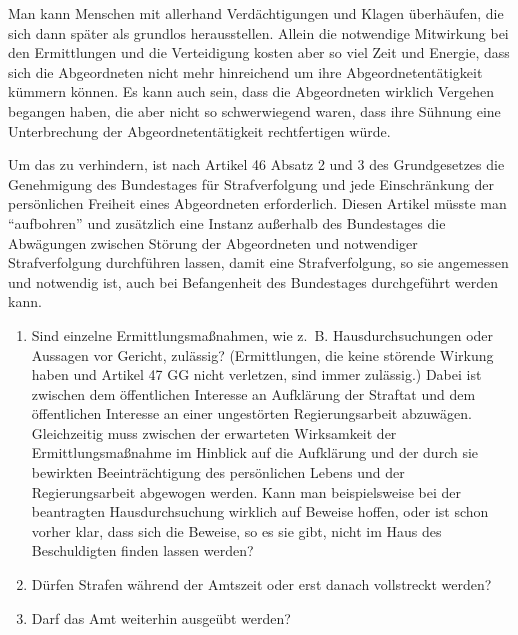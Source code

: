 Man kann Menschen mit allerhand Verdächtigungen und Klagen überhäufen, die sich dann später als grundlos herausstellen.
Allein die notwendige Mitwirkung bei den Ermittlungen und die Verteidigung kosten aber so viel Zeit und Energie, dass sich die Abgeordneten nicht mehr hinreichend um ihre Abgeordnetentätigkeit kümmern können.
Es kann auch sein, dass die Abgeordneten wirklich Vergehen begangen haben, die aber nicht so schwerwiegend waren, dass ihre Sühnung eine Unterbrechung der Abgeordnetentätigkeit rechtfertigen würde.

Um das zu verhindern, ist nach Artikel 46 Absatz 2 und 3 des Grundgesetzes die Genehmigung des Bundestages für Strafverfolgung und jede Einschränkung der persönlichen Freiheit eines Abgeordneten erforderlich.
Diesen Artikel müsste man \enquote{aufbohren} und zusätzlich eine Instanz außerhalb des Bundestages die Abwägungen zwischen Störung der Abgeordneten und notwendiger Strafverfolgung durchführen
lassen, damit eine Strafverfolgung, so sie angemessen und notwendig ist, auch bei Befangenheit des Bundestages durchgeführt werden kann.


 \begin{enumerate}
     \item Sind einzelne Ermittlungsmaßnahmen, wie z.~B. Hausdurchsuchungen oder Aussagen vor Gericht, zulässig?
     (Ermittlungen, die keine störende Wirkung haben und Artikel 47 GG nicht verletzen, sind immer zulässig.)
     Dabei ist zwischen dem öffentlichen Interesse an Aufklärung der Straftat und dem öffentlichen Interesse an einer ungestörten Regierungsarbeit abzuwägen.
     Gleichzeitig muss zwischen der erwarteten Wirksamkeit der Ermittlungsmaßnahme im Hinblick auf die Aufklärung und der durch sie bewirkten Beeinträchtigung des persönlichen Lebens und der Regierungsarbeit abgewogen werden.
     Kann man beispielsweise bei der beantragten Hausdurchsuchung wirklich auf Beweise hoffen, oder ist schon vorher klar, dass sich die Beweise, so es sie gibt, nicht im Haus des Beschuldigten finden lassen werden?
     \item Dürfen Strafen während der Amtszeit oder erst danach vollstreckt werden?
     \item Darf das Amt weiterhin ausgeübt werden?
 \end{enumerate}

